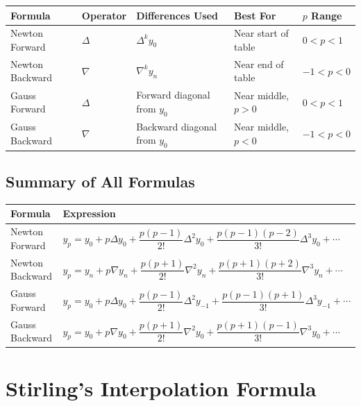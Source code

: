 \documentclass[12pt]{article}
\newcommand{\hcell}[1]{\textbf{\color{white}#1}}
\begin{document}
\begin{center}{\footnotesize\setlength{\tabcolsep}{4pt}
\begin{tabular}{p{3.2cm} C{2.2cm} C{2.8cm} C{2.8cm} C{2.5cm}}
\toprule
{}
\hcell{Formula} & \hcell{Operator} & \hcell{Differences Used} & \hcell{Best For} & \hcell{$p$ Range} \\
\midrule
{}
Newton Forward & $\Delta$ & $\Delta^k y_0$ & Near start of table & $0 < p < 1$ \\
Newton Backward & $\nabla$ & $\nabla^k y_n$ & Near end of table & $-1 < p < 0$ \\
Gauss Forward & $\Delta$ & Forward diagonal from $y_0$ & Near middle, $p>0$ & $0 < p < 1$ \\
Gauss Backward & $\nabla$ & Backward diagonal from $y_0$ & Near middle, $p<0$ & $-1 < p < 0$ \\
\bottomrule
\end{tabular}
}\end{center}

\bigskip

\subsection*{Summary of All Formulas}

\begin{center}{\small
\begin{tabular}{p{3cm} p{11cm}}
\toprule
\rowcolor{primary}
\hcell{Formula} & \hcell{Expression} \\
\midrule
\rowcolor{amberbg}
Newton Forward & $y_p = y_0 + p\Delta y_0 + \dfrac{p(p-1)}{2!}\Delta^2 y_0 + \dfrac{p(p-1)(p-2)}{3!}\Delta^3 y_0 + \cdots$ \\[10pt]
Newton Backward & $y_p = y_n + p\nabla y_n + \dfrac{p(p+1)}{2!}\nabla^2 y_n + \dfrac{p(p+1)(p+2)}{3!}\nabla^3 y_n + \cdots$ \\[10pt]
\rowcolor{amberbg}
Gauss Forward & $y_p = y_0 + p\Delta y_0 + \dfrac{p(p-1)}{2!}\Delta^2 y_{-1} + \dfrac{p(p-1)(p+1)}{3!}\Delta^3 y_{-1} + \cdots$ \\[10pt]
Gauss Backward & $y_p = y_0 + p\nabla y_0 + \dfrac{p(p+1)}{2!}\nabla^2 y_0 + \dfrac{p(p+1)(p-1)}{3!}\nabla^3 y_0 + \cdots$ \\[10pt]
\bottomrule
\end{tabular}
}\end{center}


\newpage
\section{Stirling's Interpolation Formula}
\end{document}
